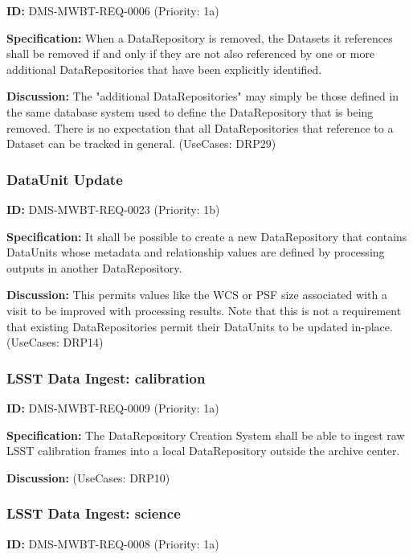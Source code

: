 \documentclass[SE,toc,lsstdraft]{lsstdoc}
\begin{document}
\label{DMS-MWBT-REQ-0006}
\textbf{ID:} DMS-MWBT-REQ-0006 (Priority: 1a)

\textbf{Specification:}
When a DataRepository is removed, the Datasets it references shall be removed if and only if they are not also referenced by one or more additional DataRepositories that have been explicitly identified.

\textbf{Discussion:}
The "additional DataRepositories" may simply be those defined in the same database system used to define the DataRepository that is being removed. There is no expectation that all DataRepositories that reference to a Dataset can be tracked in general. (UseCases: DRP29)

\subsubsection{DataUnit Update}

\label{DMS-MWBT-REQ-0023}
\textbf{ID:} DMS-MWBT-REQ-0023 (Priority: 1b)

\textbf{Specification:}
It shall be possible to create a new DataRepository that contains DataUnits whose metadata and relationship values are defined by processing outputs in another DataRepository.

\textbf{Discussion:}
This permits values like the WCS or PSF size associated with a visit to be improved with processing results. Note that this is not a requirement that existing DataRepositories permit their DataUnits to be updated in-place. (UseCases: DRP14)

\subsubsection{LSST Data Ingest: calibration}

\label{DMS-MWBT-REQ-0009}
\textbf{ID:} DMS-MWBT-REQ-0009 (Priority: 1a)

\textbf{Specification:}
The DataRepository Creation System shall be able to ingest raw LSST calibration frames into a local DataRepository outside the archive center.

\textbf{Discussion:}
(UseCases: DRP10)

\subsubsection{LSST Data Ingest: science}

\label{DMS-MWBT-REQ-0008}
\textbf{ID:} DMS-MWBT-REQ-0008 (Priority: 1a)
\end{document}
